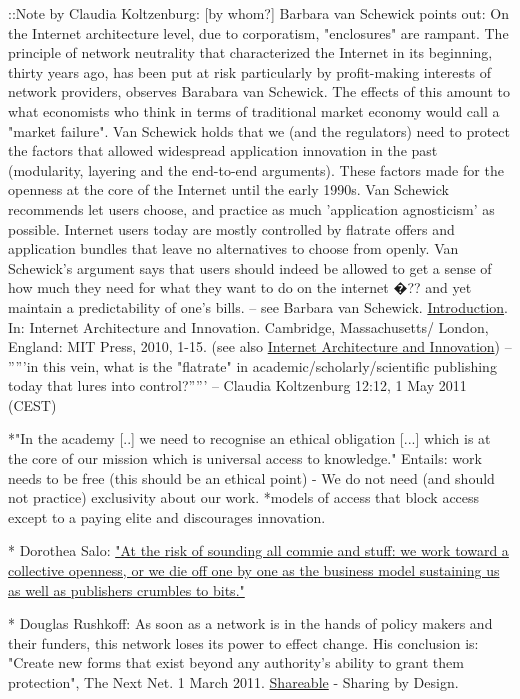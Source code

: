 \documentclass[final,authoryear,3p]{elsarticle-open-drafting}
\begin{document}
\begin{enumerate}
::Note by Claudia Koltzenburg:  [by whom?] Barbara van Schewick points out: On the Internet architecture level, due to corporatism, "enclosures" are rampant. The principle of network neutrality that characterized the Internet in its beginning, thirty years ago, has been put at risk particularly by profit-making interests of network providers, observes Barabara van Schewick. The effects of this amount to what economists who think in terms of traditional market economy would call a "market failure". Van Schewick holds that we (and the regulators) need to protect the factors that allowed widespread application innovation in the past (modularity, layering and the end-to-end arguments). These factors made for the openness at the core of the Internet until the early 1990s. Van Schewick recommends let users choose, and practice as much 'application agnosticism' as possible. Internet users today are mostly controlled by flatrate offers and application bundles that leave no alternatives to choose from openly. Van Schewick's argument says that users should indeed be allowed to get a sense of how much they need for what they want to do on the internet �?? and yet maintain a predictability of one's bills. -- see Barbara van Schewick. \href{http://mitpress.mit.edu/books/chapters/0262013975intro1.pdf}{Introduction}. In: Internet Architecture and Innovation. Cambridge, Massachusetts/ London, England: MIT Press, 2010, 1-15.  (see also \href{http://p2pfoundation.net/Internet_Architecture_and_Innovation}{Internet Architecture and Innovation}) -- '''''in this vein, what is the "flatrate" in academic/scholarly/scientific publishing today that lures into control?''''' -- Claudia Koltzenburg 12:12, 1 May 2011 (CEST)

*"In the academy [..] we need to recognise an ethical obligation [...] which is at the core of our mission which is universal access to knowledge." Entails: work needs to be free (this should be an ethical point) - We do not need (and should not practice) exclusivity about our work. 
*models of access that block access except to a paying elite and discourages innovation.

* Dorothea Salo:  \href{http://scientopia.org/blogs/bookoftrogool/2010/09/16/not-hanging-separately/}{"At the risk of sounding all commie and stuff: we work toward a collective openness, or we die off one by one as the business model sustaining us as well as publishers crumbles to bits."}

* Douglas Rushkoff: As soon as a network is in the hands of policy makers and their funders, this network loses its power to effect change. His conclusion is: "Create new forms that exist beyond any authority's ability to grant them protection", The Next Net. 1 March 2011. \href{http://shareable.net/blog/the-next-net}{Shareable} - Sharing by Design. 


\end{enumerate}
\end{document}
